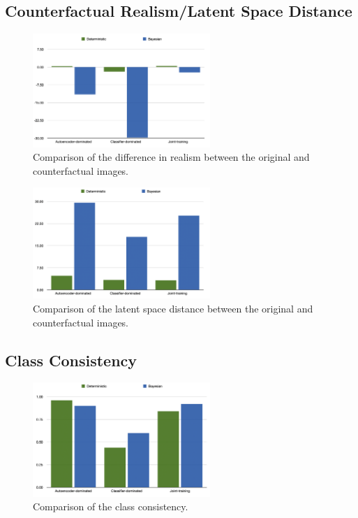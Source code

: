 \documentclass{article}
\begin{document}
\subsection{Counterfactual Realism/Latent Space Distance}
\begin{figure}[H]
    \centering
    \includegraphics[width=0.6\textwidth]{figures/CLUE/CLUERealism.png}
    \caption{Comparison of the difference in realism between the original and counterfactual images.}
    \label{fig:counterfactual_realism}
\end{figure}

\begin{figure}[H]
    \centering
    \includegraphics[width=0.6\textwidth]{figures/CLUE/CLUELatentDistance.png}
    \caption{Comparison of the latent space distance between the original and counterfactual images.}
    \label{fig:counterfactual_latent_distance}
\end{figure}


\subsection{Class Consistency}

\begin{figure}[H]
    \centering
    \includegraphics[width=0.6\textwidth]{figures/CLUE/ClassConsistency.png}
    \caption{Comparison of the class consistency.}
    \label{fig:class_consistency}
\end{figure}
\end{document}
